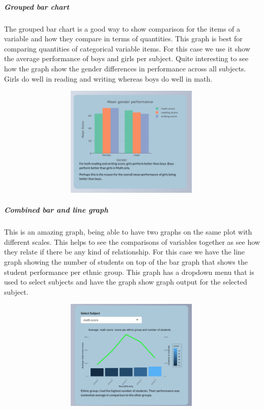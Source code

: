 \documentclass[
]{article}
\begin{document}
\newpage

\hypertarget{grouped-bar-chart}{%
\subparagraph{Grouped bar chart}\label{grouped-bar-chart}}

The grouped bar chart is a good way to show comparison for the items of
a variable and how they compare in terms of quantities. This graph is
best for comparing quantities of categorical variable items. For this
case we use it show the average performance of boys and girls per
subject. Quite interesting to see how the graph show the gender
differences in performance across all subjects. Girls do well in reading
and writing whereas boys do well in math.

\includegraphics[width=5.20833in,height=2.08333in]{www/bar.png}

\newpage

\hypertarget{combined-bar-and-line-graph}{%
\subparagraph{Combined bar and line
graph}\label{combined-bar-and-line-graph}}

This is an amazing graph, being able to have two graphs on the same plot
with different scales. This helps to see the comparisons of variables
together as see how they relate if there be any kind of relationship.
For this case we have the line graph showing the number of students on
top of the bar graph that shows the student performance per ethnic
group. This graph has a dropdown menu that is used to select subjects
and have the graph show graph output for the selected subject.

\includegraphics[width=5.20833in,height=2.08333in]{www/barlinegraph.png}
\end{document}

